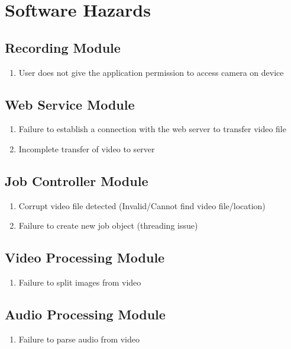 \documentclass{article}
\begin{document}
\section{Software Hazards}
\renewcommand\thesubsection{\thesection.\Alph{subsection}}

\subsection{Recording Module}
\renewcommand{\labelenumi}{\arabic{enumi}}
\begin{enumerate}
    \item User does not give the application permission to access camera on device
\end{enumerate}

\subsection{Web Service Module}
\begin{enumerate}
    \item Failure to establish a connection with the web server to transfer video file
    \item Incomplete transfer of video to server
\end{enumerate}

\subsection{Job Controller Module}
\begin{enumerate}
    \item Corrupt video file detected (Invalid/Cannot find video file/location)
    \item Failure to create new job object (threading issue)
\end{enumerate}

\subsection{Video Processing Module}
\begin{enumerate}
    \item Failure to split images from video
\end{enumerate}

\subsection{Audio Processing Module}
\begin{enumerate}
    \item Failure to parse audio from video
\end{enumerate}
\end{document}
